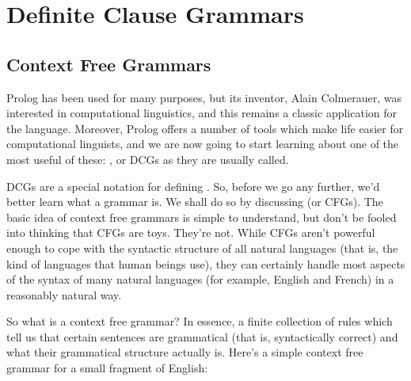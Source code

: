 
\chapter{Definite Clause Grammars}\label{CHAPTER7}





\section{Context Free Grammars}\label{SEC.L7.CFG}

Prolog has been used for many purposes, but its inventor, Alain
Colmerauer, was interested in computational linguistics, and this
remains a classic application for the language.  Moreover, Prolog
offers a number of tools which make life easier for computational
linguists, and we are now going to start learning about one of the
most useful of these: , or DCGs as
they are usually called.

 DCGs are a special notation for defining .  So,
before we go any further, we'd better learn what a grammar is.  We
shall do so by discussing  (or CFGs).
The basic idea of context free grammars is simple to understand, but
don't be fooled into thinking that CFGs are toys.  They're not.  While
CFGs aren't powerful enough to cope with the syntactic structure of
all natural languages (that is, the kind of languages that human
beings use), they can certainly handle most aspects of the syntax of
many natural languages (for example, English and French) in a
reasonably natural way.

 So what is a context free grammar?  In essence, a finite
collection of rules which tell us that certain sentences are
grammatical (that is, syntactically correct) and what their
grammatical structure actually is.  Here's a simple context free
grammar for a small fragment of English:


